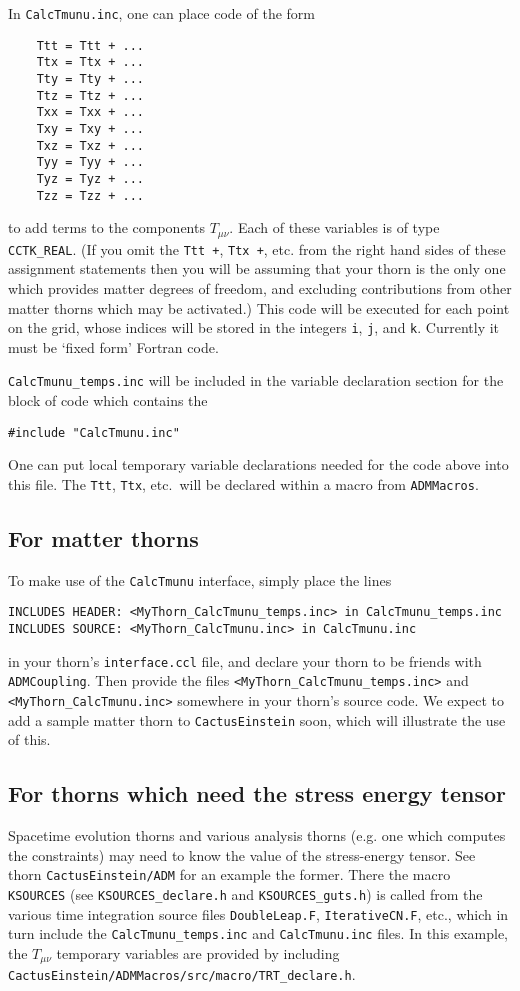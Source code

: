\documentclass{article}
\begin{document}
In \texttt{CalcTmunu.inc}, one can place code of the form
\begin{verbatim}
	Ttt = Ttt + ...
	Ttx = Ttx + ...
	Tty = Tty + ...
	Ttz = Ttz + ...
	Txx = Txx + ...
	Txy = Txy + ...
	Txz = Txz + ...
	Tyy = Tyy + ...
	Tyz = Tyz + ...
	Tzz = Tzz + ...
\end{verbatim}
to add terms to the components $T_{\mu\nu}$.  Each of these variables
is of type \texttt{CCTK\_REAL}.  (If you omit the
\texttt{Ttt \nolinebreak+}, \texttt{Ttx \nolinebreak+}, etc. from the right hand sides of
these assignment statements then you will be assuming that your thorn
is the only one which provides matter degrees of freedom, and
excluding contributions from other matter thorns which may be
activated.)
This code will be
executed for each point on the grid, whose indices will be stored in
the integers \texttt{i}, \texttt{j}, and \texttt{k}.  Currently it must be 
`fixed form' Fortran code.

\texttt{CalcTmunu\_temps.inc} will be
included in the variable declaration section for the block of code
which contains the
\nopagebreak
\begin{verbatim}
#include "CalcTmunu.inc"
\end{verbatim}
One can put local temporary variable declarations needed for the code
above into this file.  The \texttt{Ttt}, \texttt{Ttx}, etc.~will be
declared within a macro from \texttt{ADMMacros}.

\subsection{For matter thorns}
To make use of the {\tt CalcTmunu} interface, simply place the lines
\begin{verbatim}
INCLUDES HEADER: <MyThorn_CalcTmunu_temps.inc> in CalcTmunu_temps.inc
INCLUDES SOURCE: <MyThorn_CalcTmunu.inc> in CalcTmunu.inc
\end{verbatim}
in your thorn's \texttt{interface.ccl} file, and declare your thorn to
be friends with \texttt{ADMCoupling}.  Then provide the files
\texttt{<MyThorn\_CalcTmunu\_temps.inc>} and
\texttt{<MyThorn\_CalcTmunu.inc>} somewhere in your thorn's source
code.
We expect to add a sample matter thorn to \texttt{CactusEinstein}
soon, which will illustrate the use of this.

\subsection{For thorns which need the stress energy tensor}
Spacetime evolution thorns and various analysis thorns (e.g. one which
computes the constraints) may need to
know the value of the stress-energy tensor.
See thorn \texttt{CactusEinstein/ADM} for an example the former.
There the macro \texttt{KSOURCES} (see \texttt{KSOURCES\_declare.h}
and \texttt{KSOURCES\_guts.h}) is called from the various time
integration source files \texttt{DoubleLeap.F},
\texttt{IterativeCN.F}, etc., which in turn include the
\texttt{CalcTmunu\_temps.inc} and \texttt{CalcTmunu.inc} files.  In
this example, the
$T_{\mu\nu}$ temporary variables are provided by including
\texttt{CactusEinstein/ADMMacros/src/macro/TRT\_declare.h}.

\end{document}
